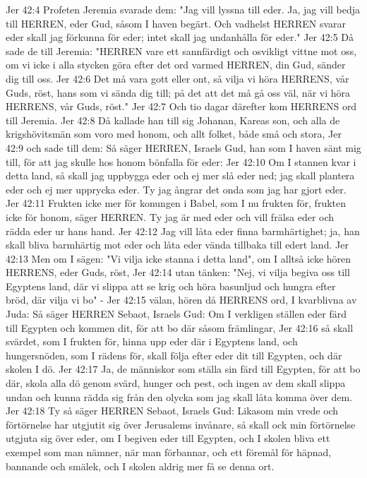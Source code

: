 Jer 42:4  Profeten Jeremia svarade dem: "Jag vill lyssna till eder. Ja, jag vill bedja till HERREN, eder Gud, såsom I haven begärt. Och vadhelst HERREN svarar eder skall jag förkunna för eder; intet skall jag undanhålla för eder."
Jer 42:5  Då sade de till Jeremia: "HERREN vare ett sannfärdigt och osvikligt vittne mot oss, om vi icke i alla stycken göra efter det ord varmed HERREN, din Gud, sänder dig till oss.
Jer 42:6  Det må vara gott eller ont, så vilja vi höra HERRENS, vår Guds, röst, hans som vi sända dig till; på det att det må gå oss väl, när vi höra HERRENS, vår Guds, röst."
Jer 42:7  Och tio dagar därefter kom HERRENS ord till Jeremia.
Jer 42:8  Då kallade han till sig Johanan, Kareas son, och alla de krigshövitsmän som voro med honom, och allt folket, både små och stora,
Jer 42:9  och sade till dem: Så säger HERREN, Israels Gud, han som I haven sänt mig till, för att jag skulle hos honom bönfalla för eder:
Jer 42:10  Om I stannen kvar i detta land, så skall jag uppbygga eder och ej mer slå eder ned; jag skall plantera eder och ej mer upprycka eder. Ty jag ångrar det onda som jag har gjort eder.
Jer 42:11  Frukten icke mer för konungen i Babel, som I nu frukten för, frukten icke för honom, säger HERREN. Ty jag är med eder och vill frälsa eder och rädda eder ur hans hand.
Jer 42:12  Jag vill låta eder finna barmhärtighet; ja, han skall bliva barmhärtig mot eder och låta eder vända tillbaka till edert land.
Jer 42:13  Men om I sägen: "Vi vilja icke stanna i detta land", om I alltså icke hören HERRENS, eder Guds, röst,
Jer 42:14  utan tänken: "Nej, vi vilja begiva oss till Egyptens land, där vi slippa att se krig och höra basunljud och hungra efter bröd, där vilja vi bo" -
Jer 42:15  välan, hören då HERRENS ord, I kvarblivna av Juda: Så säger HERREN Sebaot, Israels Gud: Om I verkligen ställen eder färd till Egypten och kommen dit, för att bo där såsom främlingar,
Jer 42:16  så skall svärdet, som I frukten för, hinna upp eder där i Egyptens land, och hungersnöden, som I rädens för, skall följa efter eder dit till Egypten, och där skolen I dö.
Jer 42:17  Ja, de människor som ställa sin färd till Egypten, för att bo där, skola alla dö genom svärd, hunger och pest, och ingen av dem skall slippa undan och kunna rädda sig från den olycka som jag skall låta komma över dem.
Jer 42:18  Ty så säger HERREN Sebaot, Israels Gud: Likasom min vrede och förtörnelse har utgjutit sig över Jerusalems invånare, så skall ock min förtörnelse utgjuta sig över eder, om I begiven eder till Egypten, och I skolen bliva ett exempel som man nämner, när man förbannar, och ett föremål för häpnad, bannande och smälek, och I skolen aldrig mer få se denna ort.

